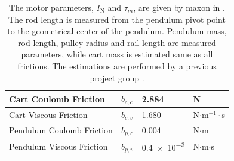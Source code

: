 \begin{table}[H]
\begin{tabular}{|l|l|l|l|}
    \hline %
    Cart Coulomb Friction     &   $b_{c,c}$       &   \num{2.884}     &  N            \\
    \hline %
    Cart Viscous Friction     &   $b_{c,v}$       &   \num{1.680}     &  N$\cdot$m$^{-1}\cdot$s \\
    \hline %
    Pendulum Coulomb Friction &   $b_{p,c}$       &   \num{0.004}     &  N$\cdot$m              \\
    \hline %
    Pendulum Viscous Friction &   $b_{p,v}$       &   \num{0.4e-3}    &  N$\cdot$m$\cdot$s      \\
    \hline %
  \end{tabular}
  \caption{The motor parameters, $I_{\mathrm{N}}$ and $\tau_m$, are given by maxon in \cite{maxonMotor}. The rod length is measured from the pendulum pivot point to the geometrical center of the pendulum. Pendulum mass, rod length, pulley radius and rail length are measured parameters, while cart mass is estimated same as all frictions. The estimations are performed by a previous project group \cite{JHHorgensen}.\label{table:systemParameters}}
\end{table}

